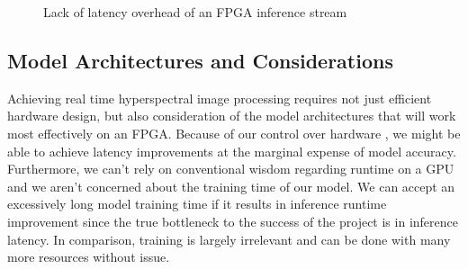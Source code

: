 \documentclass{article}
\newcommand{\mycomment}[1]{}
\begin{document}
\begin{figure}[ht]
\centering
{}
\caption{Lack of latency overhead of an FPGA inference stream}
\label{fig:fpgadiagram}
\end{figure}

\subsection{Model Architectures and Considerations}
Achieving real time hyperspectral image processing requires not just efficient hardware design, but also consideration of the model architectures that will work most effectively on an FPGA. Because of our control over hardware
\mycomment{Note: not sure what I wanted to say here and usage of pipelining and fixed data types},
we might be able to achieve latency improvements at the marginal expense of model accuracy. Furthermore, we can't rely on conventional wisdom regarding runtime on a GPU and we aren't concerned about the training time of our model. We can accept an excessively long model training time if it results in inference runtime improvement since the true bottleneck to the success of the project is in inference latency. In comparison, training is largely irrelevant and can be done with many more resources without issue.
\end{document}
